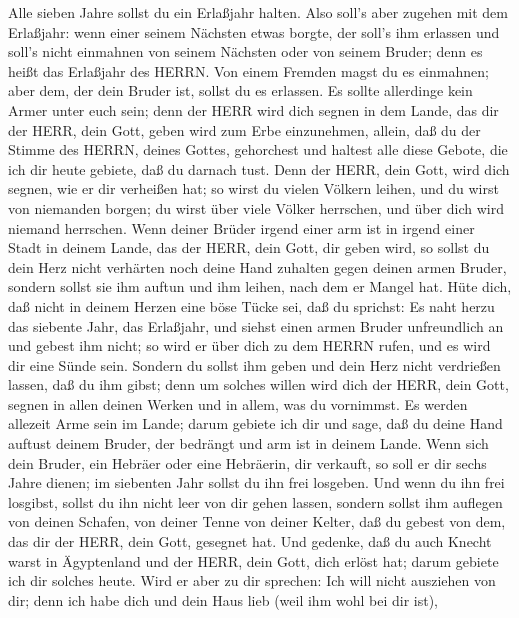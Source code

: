 Alle sieben Jahre sollst du ein Erlaßjahr halten.
 Also soll's aber zugehen mit dem Erlaßjahr: wenn einer
seinem Nächsten etwas borgte, der soll's ihm erlassen und soll's nicht
einmahnen von seinem Nächsten oder von seinem Bruder; denn es heißt das
Erlaßjahr des HERRN.  Von einem Fremden magst du es
einmahnen; aber dem, der dein Bruder ist, sollst du es erlassen.
 Es sollte allerdinge kein Armer unter euch sein; denn der
HERR wird dich segnen in dem Lande, das dir der HERR, dein Gott, geben
wird zum Erbe einzunehmen,  allein, daß du der Stimme des
HERRN, deines Gottes, gehorchest und haltest alle diese Gebote, die ich
dir heute gebiete, daß du darnach tust.  Denn der HERR, dein
Gott, wird dich segnen, wie er dir verheißen hat; so wirst du vielen
Völkern leihen, und du wirst von niemanden borgen; du wirst über viele
Völker herrschen, und über dich wird niemand herrschen. 
Wenn deiner Brüder irgend einer arm ist in irgend einer Stadt in deinem
Lande, das der HERR, dein Gott, dir geben wird, so sollst du dein Herz
nicht verhärten noch deine Hand zuhalten gegen deinen armen Bruder,
 sondern sollst sie ihm auftun und ihm leihen, nach dem er
Mangel hat.  Hüte dich, daß nicht in deinem Herzen eine böse
Tücke sei, daß du sprichst: Es naht herzu das siebente Jahr, das
Erlaßjahr, und siehst einen armen Bruder unfreundlich an und gebest ihm
nicht; so wird er über dich zu dem HERRN rufen, und es wird dir eine
Sünde sein.  Sondern du sollst ihm geben und dein Herz
nicht verdrießen lassen, daß du ihm gibst; denn um solches willen wird
dich der HERR, dein Gott, segnen in allen deinen Werken und in allem,
was du vornimmst.  Es werden allezeit Arme sein im Lande;
darum gebiete ich dir und sage, daß du deine Hand auftust deinem Bruder,
der bedrängt und arm ist in deinem Lande.  Wenn sich dein
Bruder, ein Hebräer oder eine Hebräerin, dir verkauft, so soll er dir
sechs Jahre dienen; im siebenten Jahr sollst du ihn frei losgeben.
 Und wenn du ihn frei losgibst, sollst du ihn nicht leer
von dir gehen lassen,  sondern sollst ihm auflegen von
deinen Schafen, von deiner Tenne von deiner Kelter, daß du gebest von
dem, das dir der HERR, dein Gott, gesegnet hat.  Und
gedenke, daß du auch Knecht warst in Ägyptenland und der HERR, dein
Gott, dich erlöst hat; darum gebiete ich dir solches heute.
 Wird er aber zu dir sprechen: Ich will nicht ausziehen von
dir; denn ich habe dich und dein Haus lieb (weil ihm wohl bei dir ist),
